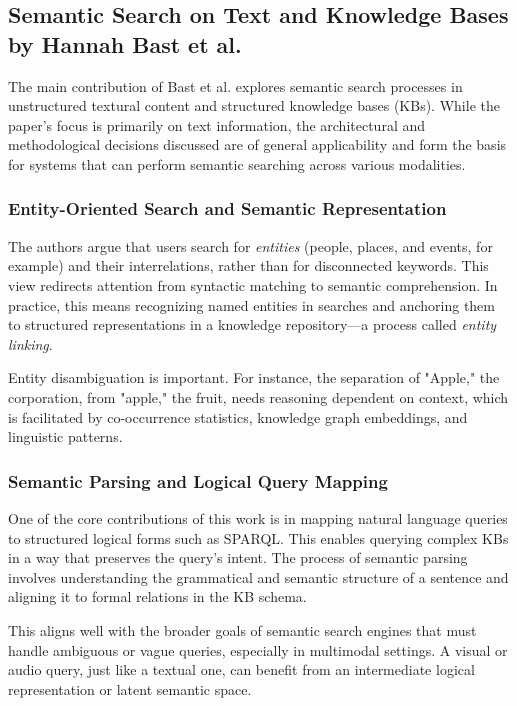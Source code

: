 \documentclass[conference]{IEEEtran}
\begin{document}
\subsection{Semantic Search on Text and Knowledge Bases by Hannah Bast et al.}
The main contribution of Bast et al.\cite{bast2016semantic} explores semantic search processes in unstructured textural content and structured knowledge bases (KBs). While the paper's focus is primarily on text information, the architectural and methodological decisions discussed are of general applicability and form the basis for systems that can perform semantic searching across various modalities.

\subsubsection{Entity-Oriented Search and Semantic Representation}
The authors argue that users search for \textit{entities} (people, places, and events, for example) and their interrelations, rather than for disconnected keywords. This view redirects attention from syntactic matching to semantic comprehension. In practice, this means recognizing named entities in searches and anchoring them to structured representations in a knowledge repository—a process called \textit{entity linking}.

Entity disambiguation is important. For instance, the separation of "Apple," the corporation, from "apple," the fruit, needs reasoning dependent on context, which is facilitated by co-occurrence statistics, knowledge graph embeddings, and linguistic patterns.


\subsubsection{Semantic Parsing and Logical Query Mapping}
One of the core contributions of this work is in mapping natural language queries to structured logical forms such as SPARQL. This enables querying complex KBs in a way that preserves the query's intent. The process of semantic parsing involves understanding the grammatical and semantic structure of a sentence and aligning it to formal relations in the KB schema.

This aligns well with the broader goals of semantic search engines that must handle ambiguous or vague queries, especially in multimodal settings. A visual or audio query, just like a textual one, can benefit from an intermediate logical representation or latent semantic space.
\end{document}
